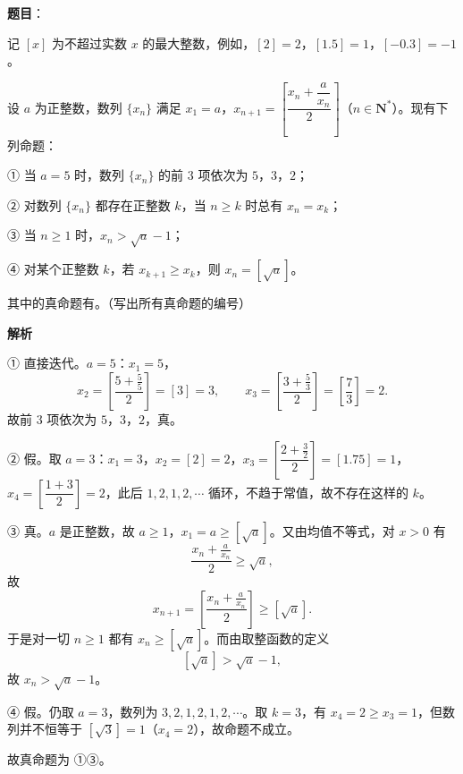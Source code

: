 \begin{answer}

\textbf{题目}：

记 $[x]$ 为不超过实数 $x$ 的最大整数，例如，$[2]=2$，$[1.5]=1$，$[-0.3]=-1$。

设 $a$ 为正整数，数列 $\{x_n\}$ 满足 $x_1=a$，$x_{n+1}=\left[\dfrac{x_n+\dfrac{a}{x_n}}{2}\right]$（$n\in\mathbf N^*$）。现有下列命题：

① 当 $a=5$ 时，数列 $\{x_n\}$ 的前 $3$ 项依次为 $5$，$3$，$2$；

② 对数列 $\{x_n\}$ 都存在正整数 $k$，当 $n\geqslant k$ 时总有 $x_n=x_k$；

③ 当 $n\geqslant1$ 时，$x_n>\sqrt a-1$；

④ 对某个正整数 $k$，若 $x_{k+1}\geqslant x_k$，则 $x_n=[\sqrt a]$。

其中的真命题有\gkblank{}。（写出所有真命题的编号）

\textbf{解析}

① 直接迭代。$a=5$：$x_1=5$，
\nopagebreak[4]
\[x_2=\left[\frac{5+\frac55}{2}\right]=[3]=3,\qquad x_3=\left[\frac{3+\frac53}{2}\right]=\left[\frac73\right]=2.\]
故前 $3$ 项依次为 $5$，$3$，$2$，真。

② 假。取 $a=3$：$x_1=3$，$x_2=[2]=2$，$x_3=\left[\dfrac{2+\frac32}2\right]=[1.75]=1$，$x_4=\left[\dfrac{1+3}2\right]=2$，此后 $1,2,1,2,\cdots$ 循环，不趋于常值，故不存在这样的 $k$。

③ 真。$a$ 是正整数，故 $a\geqslant1$，$x_1=a\geqslant[\sqrt a]$。又由均值不等式，对 $x>0$ 有
\nopagebreak[4]
\[\frac{x_n+\frac a{x_n}}2\geqslant\sqrt a,\]
故
\nopagebreak[4]
\[x_{n+1}=\left[\frac{x_n+\frac a{x_n}}2\right]\geqslant\left[\sqrt a\right].\]
于是对一切 $n\geqslant1$ 都有 $x_n\geqslant[\sqrt a]$。而由取整函数的定义
\nopagebreak[4]
\[[\sqrt a]>\sqrt a-1,\]
故 $x_n>\sqrt a-1$。

④ 假。仍取 $a=3$，数列为 $3,2,1,2,1,2,\cdots$。取 $k=3$，有 $x_4=2\geqslant x_3=1$，但数列并不恒等于 $[\sqrt3]=1$（$x_4=2$），故命题不成立。

故真命题为 ①③。


\end{answer}
